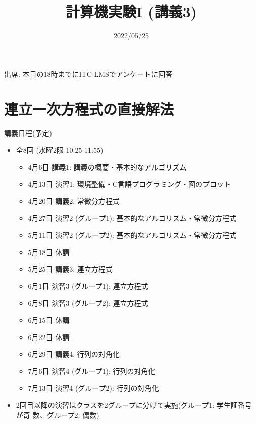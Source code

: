 \documentclass[10pt,dvipdfmx]{beamer}
\title{計算機実験I (講義3)}
\date{2022/05/25}
\begin{document}
\begin{frame}
  \titlepage
  \tableofcontents
  出席: 本日の18時までにITC-LMSでアンケートに回答
\end{frame}





\section{連立一次方程式の直接解法}


























\begin{frame}[t]{講義日程(予定)}
  \begin{itemize}
  \item 全8回 (水曜2限 10:25-11:55)
    \begin{itemize}
    \item 4月6日 講義1: 講義の概要・基本的なアルゴリズム
    \item 4月13日 演習1: 環境整備・C言語プログラミング・図のプロット
    \item 4月20日 講義2: 常微分方程式
    \item 4月27日 演習2 (グループ1): 基本的なアルゴリズム・常微分方程式
    \item 5月11日 演習2 (グループ2): 基本的なアルゴリズム・常微分方程式
    \item {\color{gray} 5月18日 休講}
    \item 5月25日 講義3: 連立方程式
    \item 6月1日 演習3 (グループ1): 連立方程式
    \item 6月8日 演習3 (グループ2): 連立方程式
    \item {\color{gray} 6月15日 休講}
    \item {\color{gray} 6月22日 休講}
    \item 6月29日 講義4: 行列の対角化
    \item 7月6日 演習4 (グループ1): 行列の対角化
    \item 7月13日 演習4 (グループ2): 行列の対角化
    \end{itemize}
  \item 2回目以降の演習はクラスを2グループに分けて実施(グループ1: 学生証番号が奇
数、グループ2: 偶数)
  \end{itemize}
\end{frame}
\end{document}
